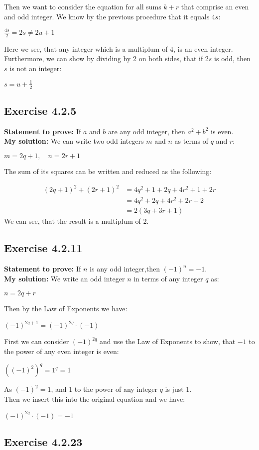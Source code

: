 \documentclass{article}
\newcommand{\cent}[1]{\begin{center}#1\end{center}}
\newcommand{\mAlign}[1]{\begin{align*}#1\end{align*}}
\newcommand{\Prove}{\textbf{Statement to prove: }}
\newcommand{\Solution}{\textbf{My solution: }}
\newcommand{\QED}{\boxed{}}
\newcommand{\Exercise}[1]{\subsection{Exercise #1}}
\begin{document}
	Then we want to consider the equation for all sums $k+r$ that comprise an even and odd integer. We know by the previous procedure that it equals $4s$:
	
	\cent{$\frac{4s}{2} = 2s \neq 2u +1$}
	
	Here we see, that any integer which is a multiplum of 4, is an even integer. Furthermore, we can show by dividing by 2 on both sides, that if $2s$ is odd, then $s$ is not an integer:
	
	\cent{$s=u+\frac{1}{2}$}
	
	\QED
	
	\Exercise{4.2.5}
	\Prove
	If $a$ and $b$ are any odd integer, then $a^2 + b^2$ is even.\\
	
	\Solution
	We can write two odd integers $m$ and $n$ as terms of $q$ and $r$:
	\cent{$m = 2q+1, \quad n = 2r+1$}
	
	The sum of its squares can be written and reduced as the following:
	
	\mAlign{(2q+1)^2 + (2r+1)^2 &= 4q^2 + 1 + 2q + 4r^2 + 1 +2r \\
					&= 4q^2+2q + 4r^2 + 2r +2 \\
					&= 2(3q +3r +1)}
	We can see, that the result is a multiplum of 2.\\
	\QED
	
	\Exercise{4.2.11}
	
	\Prove
	If $n$ is any odd integer,then $(-1)^n = -1$.\\
	
	\Solution
	We write an odd integer $n$ in terms of any integer $q$ as:
	
	\cent{$n = 2q+r$}
	
	Then by the Law of Exponents we have:
	
	\cent{$(-1)^{2q + 1} = (-1)^{2q} \cdot (-1)$}
	
	First we can consider $(-1)^{2q}$ and use the Law of Exponents to show, that $-1$ to the power of any even integer is even:
	
	\cent{$((-1)^2)^q = 1^q = 1$}
	
	As $(-1)^2 = 1$, and 1 to the power of any integer $q$ is just 1.\\
	
	Then we insert this into the original equation and we have:
	
	\cent{$(-1)^{2q} \cdot (-1) = -1$}
	
	\QED
	
	\Exercise{4.2.23}
	
\end{document}
